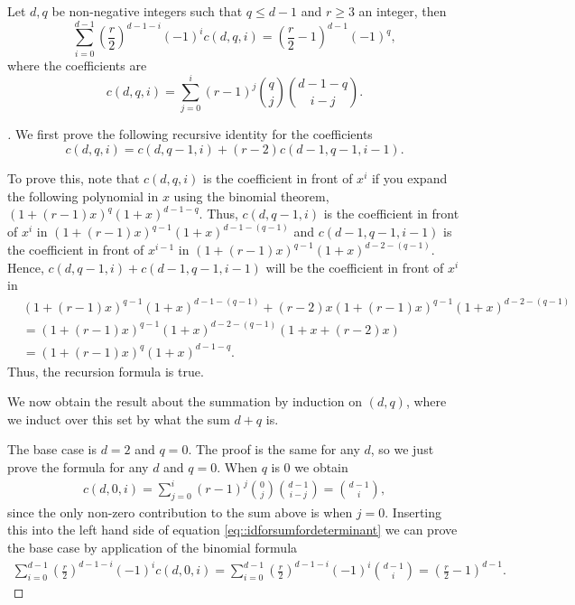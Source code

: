 \documentclass[10pt,a4paper]{amsart}
\begin{document}
\begin{lemma}
\label{lem::forsum}
    Let $d,q$ be non-negative integers such that $q \leq d-1$ and $r \geq 3$ an integer, then 
    \begin{equation}
    \label{eq::idforsumfordeterminant}
            \sum_{i = 0}^{d-1} \left(\frac{r}{2} \right)^{d-1-i} (-1)^{i} c(d,q,i)  = \left(\frac{r}{2} -1 \right)^{d-1} (-1)^{q},
    \end{equation}
where the coefficients are $$c(d,q,i) = \sum_{j = 0}^{i } (r-1)^{j} \binom{q}{j} \binom{d-1-q}{i-j}.$$    
\end{lemma}

\begin{proof}[]
We first prove the following recursive identity for the coefficients
\begin{equation*}
    c(d,q,i) = c(d, q-1, i) + (r-2)c(d-1, q-1, i-1). 
\end{equation*}

To prove this, note that $c(d,q,i)$ is the coefficient in front of $x^{i}$ if you expand the following polynomial in $x$ using the binomial theorem, $(1+(r-1)x)^{q} (1+x)^{d-1-q}$. Thus, $c(d,q-1,i)$ is the coefficient in front of $x^{i}$ in $(1+(r-1)x)^{q-1} (1+x)^{d-1-(q-1)}$ and $c(d-1, q-1, i-1)$ is the coefficient in front of $x^{i-1}$ in $(1+(r-1)x)^{q-1} (1+x)^{d-2-(q-1)}$. Hence, $c(d, q-1, i) + c(d-1, q-1, i-1)$ will be the coefficient in front of $x^{i}$ in 
\begin{align*}
    &(1+(r-1)x)^{q-1} (1+x)^{d-1-(q-1)} + (r-2)x (1+(r-1)x)^{q-1} (1+x)^{d-2-(q-1)}  \\
    &=  (1+(r-1)x)^{q-1}(1+x)^{d-2-(q-1)} (1+x +(r-2)x) \\
    &=  (1+(r-1)x)^{q} (1+x)^{d-1-q}. 
\end{align*}
Thus, the recursion formula is true. 

We now obtain the result about the summation by induction on $(d,q)$, where we induct over this set by what the sum $d + q$ is. 

The base case is $d = 2$ and $q = 0$. The proof is the same for any $d$, so we just prove the formula for any $d$ and $q = 0$. When $q$ is 0 we obtain 
\begin{align*}
    c(d,0,i) = \sum_{j = 0}^{i } (r-1)^{j} \binom{0}{j} \binom{d-1}{i-j} = \binom{d-1}{i},
\end{align*}
since the only non-zero contribution to the sum above is when $j = 0$. Inserting this into the left hand side of equation \eqref{eq::idforsumfordeterminant} we can prove the base case by application of the binomial formula
\begin{align*}
    \sum_{i = 0}^{d-1} \left(\frac{r}{2} \right)^{d-1-i} (-1)^{i} c(d,0,i) = \sum_{i = 0}^{d-1} \left(\frac{r}{2} \right)^{d-1-i} (-1)^{i} \binom{d-1}{i} = \left( \frac{r}{2} -1 \right)^{d-1}.  
\end{align*}


\end{proof}
\end{document}
